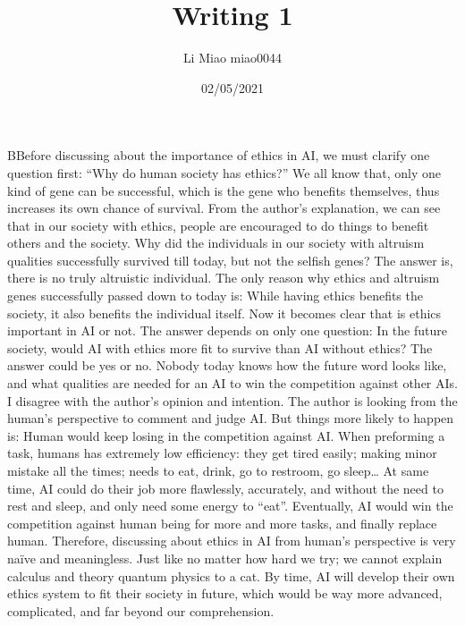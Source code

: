 \documentclass{article}
\title{Writing 1}
\author{Li Miao   miao0044}
\date{02/05/2021}
\begin{document}
\maketitle
\noindent
BBefore discussing about the importance of ethics in AI, we must clarify one question first: “Why do human society has ethics?”
\newline
\newline
We all know that, only one kind of gene can be successful, which is the gene who benefits themselves, thus increases its own chance of survival. From the author’s explanation, we can see that in our society with ethics, people are encouraged to do things to benefit others and the society. Why did the individuals in our society with altruism qualities successfully survived till today, but not the selfish genes? The answer is, there is no truly altruistic individual. The only reason why ethics and altruism genes successfully passed down to today is: While having ethics benefits the society, it also benefits the individual itself.
\newline
\newline
Now it becomes clear that is ethics important in AI or not. The answer depends on only one question: In the future society, would AI with ethics more fit to survive than AI without ethics? The answer could be yes or no. Nobody today knows how the future word looks like, and what qualities are needed for an AI to win the competition against other AIs.
\newline
\newline
I disagree with the author’s opinion and intention. The author is looking from the human’s perspective to comment and judge AI. But things more likely to happen is: Human would keep losing in the competition against AI. When preforming a task, humans has extremely low efficiency: they get tired easily; making minor mistake all the times; needs to eat, drink, go to restroom, go sleep… At same time, AI could do their job more flawlessly, accurately, and without the need to rest and sleep, and only need some energy to “eat”. Eventually, AI would win the competition against human being for more and more tasks, and finally replace human.
\newline
\newline
Therefore, discussing about ethics in AI from human’s perspective is very naïve and meaningless. Just like no matter how hard we try; we cannot explain calculus and theory quantum physics to a cat. By time, AI will develop their own ethics system to fit their society in future, which would be way more advanced, complicated, and far beyond our comprehension.
\end{document}
